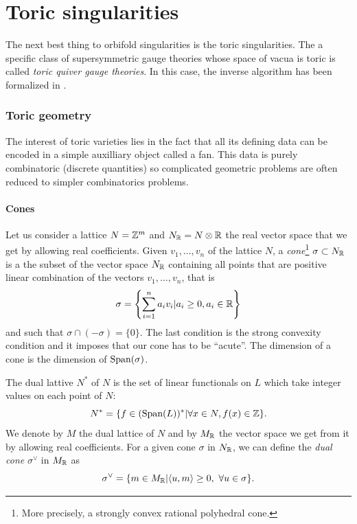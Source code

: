 



\part{Toric singularities}

    The next best thing to orbifold singularities is the toric singularities.  The a specific class of supersymmetric gauge theories whose space of vacua is toric is called \emph{toric quiver gauge theories}. In this case, the inverse algorithm has been formalized in \cite{Feng_2001}.

\section{Toric geometry}

    The interest of toric varieties lies in the fact that all its defining data can be encoded in a simple auxilliary object called a fan. This data is purely combinatoric (discrete quantities) so complicated geometric problems are often reduced to simpler combinatorics problems.

    \subsection{Cones}

        Let us consider a lattice $N=\mathbb{Z}^m$ and $N_{\mathbb{R}}=N\otimes\mathbb{R}$ the real vector space that we get by allowing real coefficients. Given $v_1,\dots,v_n$ of the lattice $N$, a \emph{cone}\footnote{More precisely, a strongly convex rational polyhedral cone.} $\sigma\subset N_{\mathbb{R}}$ is a the subset of the vector space $N_{\mathbb{R}}$ containing all points that are positive linear combination of the vectors $v_1,\dots,v_n$, that is
        \begin{equation}
            \sigma=\left\{\sum^n_{i=1}a_iv_i|a_i\geq0,a_i\in\mathbb{R}\right\}
        \end{equation}
        and such that $\sigma\cap(-\sigma)=\{0\}$. The last condition is the strong convexity condition and it imposes that our cone has to be ``acute''. The dimension of a cone is the dimension of $\text{Span}(\sigma)$.
        
        The dual lattive $N^*$ of $N$ is the set of linear functionals on $L$ which take integer values on each point of $N$:
        \begin{equation}
            N^*=\{f\in(\text{Span}(L))^*|\forall x\in N,f(x)\in\mathbb{Z}\}.
        \end{equation}
        We denote by $M$ the dual lattice of $N$ and by $M_{\mathbb{R}}$ the vector space we get from it by allowing real coefficients. For a given cone $\sigma$ in $ N_{\mathbb{R}}$, we can define the \emph{dual cone} $\sigma^\vee$ in $M_{\mathbb{R}}$ as
        \begin{equation}
            \sigma^\vee=\{m\in M_{\mathbb{R}}|\langle u,m\rangle\geq0,~ \forall u\in\sigma\}.
        \end{equation}

